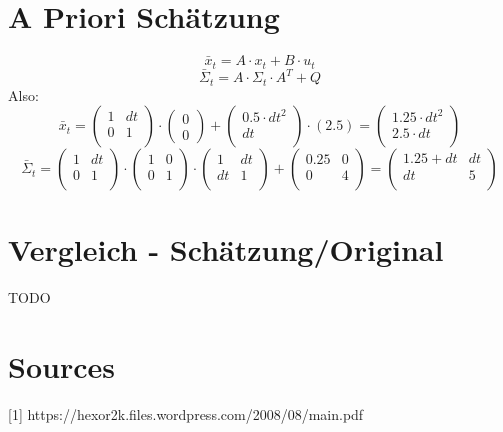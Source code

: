 \documentclass[12pt,a4paper]{article}
\begin{document}
\section{A Priori Schätzung}
\[\bar{x}_t = A \cdot x_t + B \cdot u_t\]
\[\bar{\Sigma}_t = A \cdot \Sigma_t \cdot A^T + Q\]
Also:
\[\bar{x}_t = \begin{pmatrix}
1 & dt \\
0 & 1 \\
\end{pmatrix} \cdot \begin{pmatrix}
0 \\ 0 \end{pmatrix} + \begin{pmatrix}
0.5 \cdot dt^2 \\ dt \\ \end{pmatrix} \cdot (2.5) =
\begin{pmatrix}
1.25 \cdot dt^2 \\
2.5 \cdot dt \\
\end{pmatrix}
\]
\[
\bar{\Sigma}_t = \begin{pmatrix}
1 & dt \\
0 & 1 \\
\end{pmatrix} \cdot \begin{pmatrix}
1 & 0 \\
0 & 1 \\
\end{pmatrix} \cdot \begin{pmatrix}
1 & dt \\
dt & 1 \\
\end{pmatrix} + \begin{pmatrix}
0.25 & 0 \\
0 & 4 \\
\end{pmatrix}  =
\begin{pmatrix}
1.25 + dt & dt \\
dt & 5 \\
\end{pmatrix}
\]

\section{Vergleich - Schätzung/Original}
TODO

\section*{Sources}

[1] https://hexor2k.files.wordpress.com/2008/08/main.pdf
\end{document}
